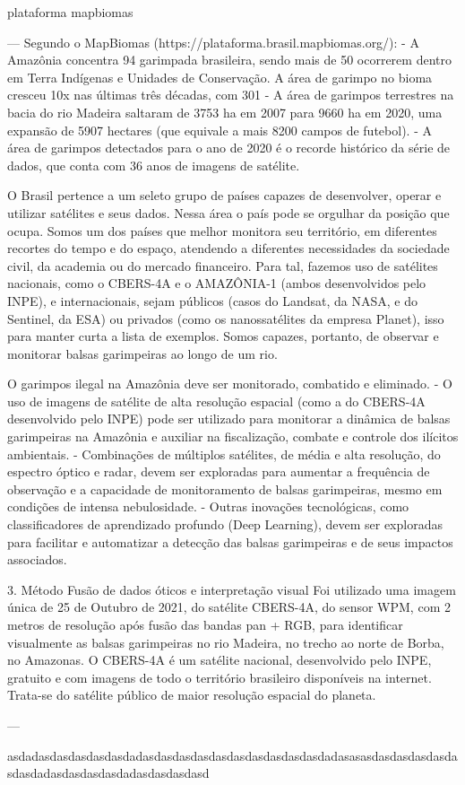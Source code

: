 plataforma mapbiomas




---
Segundo o MapBiomas (https://plataforma.brasil.mapbiomas.org/):
-
A Amazônia concentra 94%
garimpada brasileira, sendo mais de 50%
ocorrerem dentro em Terra Indígenas e Unidades de Conservação.
A área de garimpo no bioma cresceu 10x nas últimas três décadas,
com 301%
-
A área de garimpos terrestres na bacia do rio Madeira saltaram de
3753 ha em 2007 para 9660 ha em 2020, uma expansão de 5907
hectares (que equivale a mais 8200 campos de futebol).
-
A área de garimpos detectados para o ano de 2020 é o recorde
histórico da série de dados, que conta com 36 anos de imagens de
satélite.


O Brasil pertence a um seleto grupo de países capazes de
desenvolver, operar e utilizar satélites e seus dados. Nessa área o
país pode se orgulhar da posição que ocupa. Somos um dos países
que melhor monitora seu território, em diferentes recortes do
tempo e do espaço, atendendo a diferentes necessidades da
sociedade civil, da academia ou do mercado financeiro.
Para tal, fazemos uso de satélites nacionais, como o CBERS-4A e o
AMAZÔNIA-1 (ambos desenvolvidos pelo INPE), e internacionais,
sejam públicos (casos do Landsat, da NASA, e do Sentinel, da ESA)
ou privados (como os nanossatélites da empresa Planet), isso para
manter curta a lista de exemplos. Somos capazes, portanto, de
observar e monitorar balsas garimpeiras ao longo de um rio.


O garimpos ilegal na Amazônia deve ser monitorado, combatido e eliminado.
-
O uso de imagens de satélite de alta resolução espacial (como a do CBERS-4A desenvolvido pelo
INPE) pode ser utilizado para monitorar a dinâmica de balsas garimpeiras na Amazônia e
auxiliar na fiscalização, combate e controle dos ilícitos ambientais.
-
Combinações de múltiplos satélites, de média e alta resolução, do espectro óptico e radar,
devem ser exploradas para aumentar a frequência de observação e a capacidade de
monitoramento de balsas garimpeiras, mesmo em condições de intensa nebulosidade.
-
Outras inovações tecnológicas, como classificadores de aprendizado profundo (Deep Learning),
devem ser exploradas para facilitar e automatizar a detecção das balsas garimpeiras e de seus
impactos associados.




3. Método
Fusão de dados óticos e interpretação visual
Foi utilizado uma imagem única de 25 de Outubro de 2021, do satélite CBERS-4A, do sensor WPM, com 2 metros
de resolução após fusão das bandas pan + RGB, para identificar visualmente as balsas garimpeiras no rio Madeira,
no trecho ao norte de Borba, no Amazonas.
O CBERS-4A é um satélite nacional, desenvolvido pelo INPE, gratuito e com imagens de todo o território brasileiro
disponíveis na internet. Trata-se do satélite público de maior resolução espacial do planeta.

--- 


asdadasdasdasdasdasdadasdasdasdasdasdasdasdasdasdasdadasasasdasdasdasdasdasdasdadasdasdasdasdadasdasdasdasd
